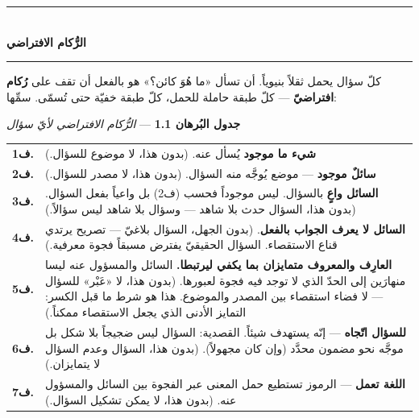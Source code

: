 \documentclass[10pt, openany, oneside]{book}
\renewcommand{\normalsize}{\fontsize{10}{13}\selectfont}
\renewcommand{\footnotesize}{\fontsize{8.5}{11}\selectfont}
\begin{document}
\vspace{1.5em}


\begin{center}
    \rule{0.3\textwidth}{0.4pt}\\[0.5em]
    {\normalsize\bfseries الرُّكام الافتراضي}\\[0.3em]
    \rule{0.3\textwidth}{0.4pt}
\end{center}

\vspace{1em}

كلّ سؤال يحمل ثقلاً بنيوياً. أن تسأل «ما هُوَ كائن؟» هو بالفعل أن تقف على \textbf{رُكام افتراضيّ} --- كلّ طبقة حاملة للحمل، كلّ طبقة خفيّة حتى تُسمّى. سمِّها:

\vspace{0.8em}

\textbf{جدول البُرهان 1.1} --- \textit{الرُّكام الافتراضي لأيّ سؤال}

\vspace{0.5em}

{\footnotesize
\noindent\begin{tabular}{r p{}}
\textbf{ف1.} & \textbf{شيء ما موجود} يُسأل عنه. (بدون هذا، لا موضوع للسؤال.) \\[0.3em]
\textbf{ف2.} & \textbf{سائلٌ موجود} --- موضع يُوجَّه منه السؤال. (بدون هذا، لا مصدر للسؤال.) \\[0.3em]
\textbf{ف3.} & \textbf{السائل واعٍ} بالسؤال. ليس موجوداً فحسب (ف2) بل واعياً بفعل السؤال. (بدون هذا، السؤال حدث بلا شاهد --- وسؤال بلا شاهد ليس سؤالاً.) \\[0.3em]
\textbf{ف4.} & \textbf{السائل لا يعرف الجواب بالفعل}. (بدون الجهل، السؤال بلاغيّ --- تصريح يرتدي قناع الاستقصاء. السؤال الحقيقيّ يفترض مسبقاً فجوة معرفية.) \\[0.3em]
\textbf{ف5.} & \textbf{العارِف والمعروف متمايزان بما يكفي ليرتبطا.} السائل والمسؤول عنه ليسا منهارَين إلى الحدّ الذي لا توجد فيه فجوة لعبورها. (بدون هذا، لا «عَبْر» للسؤال --- لا فضاء استقصاء بين المصدر والموضوع. هذا هو شرط ما قبل الكسر: التمايز الأدنى الذي يجعل الاستقصاء ممكناً.) \\[0.3em]
\textbf{ف6.} & \textbf{للسؤال اتّجاه} --- إنّه يستهدف شيئاً. القصدية: السؤال ليس ضجيجاً بلا شكل بل موجَّه نحو مضمون محدَّد (وإن كان مجهولاً). (بدون هذا، السؤال وعدم السؤال لا يتمايزان.) \\[0.3em]
\textbf{ف7.} & \textbf{اللغة تعمل} --- الرموز تستطيع حمل المعنى عبر الفجوة بين السائل والمسؤول عنه. (بدون هذا، لا يمكن تشكيل السؤال.) \\[0.3em]
\end{tabular}
}
\end{document}
